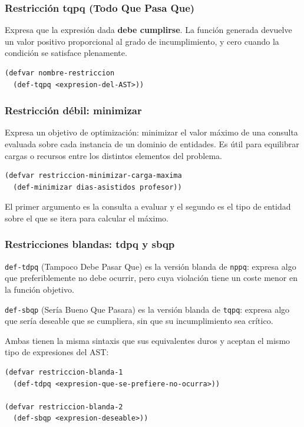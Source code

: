 \documentclass[12pt,a4paper]{article}
\newcommand{\code}[1]{\texttt{#1}}
\begin{document}
\subsubsection{Restricción tqpq (Todo Que Pasa Que)}

Expresa que la expresión dada \textbf{debe cumplirse}. La función
generada devuelve un valor positivo proporcional al grado de
incumplimiento, y cero cuando la condición se satisface plenamente.

\begin{lstlisting}[style=lisp, caption={Sintaxis de restricción tqpq}]
(defvar nombre-restriccion
  (def-tqpq <expresion-del-AST>))
\end{lstlisting}

\subsubsection{Restricción débil: minimizar}

Expresa un objetivo de optimización: minimizar el valor máximo de una
consulta evaluada sobre cada instancia de un dominio de entidades.
Es útil para equilibrar cargas o recursos entre los distintos elementos
del problema.

\begin{lstlisting}[style=lisp, caption={Restricción débil: minimizar carga máxima}]
(defvar restriccion-minimizar-carga-maxima
  (def-minimizar dias-asistidos profesor))
\end{lstlisting}

El primer argumento es la consulta a evaluar y el segundo es el tipo
de entidad sobre el que se itera para calcular el máximo.

\subsubsection{Restricciones blandas: tdpq y sbqp}

\code{def-tdpq} (Tampoco Debe Pasar Que) es la versión blanda de
\code{nppq}: expresa algo que preferiblemente no debe ocurrir, pero
cuya violación tiene un coste menor en la función objetivo.

\code{def-sbqp} (Sería Bueno Que Pasara) es la versión blanda de
\code{tqpq}: expresa algo que sería deseable que se cumpliera, sin
que su incumplimiento sea crítico.

Ambas tienen la misma sintaxis que sus equivalentes duros y aceptan
el mismo tipo de expresiones del AST:

\begin{lstlisting}[style=lisp, caption={Restricciones blandas}]
(defvar restriccion-blanda-1
  (def-tdpq <expresion-que-se-prefiere-no-ocurra>))

(defvar restriccion-blanda-2
  (def-sbqp <expresion-deseable>))
\end{lstlisting}
\end{document}
